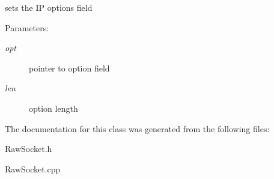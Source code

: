 sets the IP options field 

\begin{Desc}
\item[Parameters:]
\begin{description}
\item[{\em opt}]pointer to option field \item[{\em len}]option length \end{description}
\end{Desc}


The documentation for this class was generated from the following files:\begin{CompactItemize}
\item 
RawSocket.h\item 
RawSocket.cpp\end{CompactItemize}

